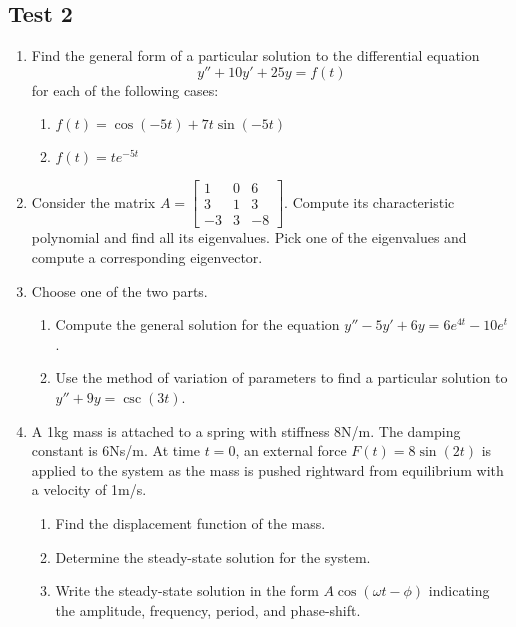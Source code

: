\subsection{Test 2}

\begin{enumerate}[label=\arabic*.]
	\item 
		Find the general form of a particular solution to the differential equation
		\begin{equation*}
			y'' + 10y' + 25y = f(t)
		\end{equation*}
		for each of the following cases:
		\begin{enumerate}[label=(\alph*)]
			\item 
				$f(t) = \cos{(-5t)} + 7t\sin{(-5t)}$
			\item
				$f(t) = te^{-5t}$
		\end{enumerate}
	\item
		Consider the matrix $A = \begin{bmatrix}
			1  & 0 & 6 \\
			3  & 1 & 3 \\
			-3 & 3 & -8
		\end{bmatrix}$. Compute its characteristic polynomial and find all its eigenvalues. Pick one of the eigenvalues and compute a corresponding eigenvector.
	\item
		Choose one of the two parts.
		\begin{enumerate}[label=(\alph*)]
			\item 
				Compute the general solution for the equation $y'' - 5y' + 6y = 6e^{4t} - 10e^{t}$.
			\item Use the method of variation of parameters to find a particular solution to $y'' + 9y = \csc{(3t)}$.
		\end{enumerate}
	\item
		A 1kg mass is attached to a spring with stiffness 8N/m. The damping constant is 6Ns/m. At time $t=0$, an external force $F(t) = 8\sin{(2t)}$ is applied to the system as the mass is pushed rightward from equilibrium with a velocity of 1m/s.
		\begin{enumerate}[label=(\alph*)]
			\item
				Find the displacement function of the mass.
			\item
				Determine the steady-state solution for the system.
			\item
				Write the steady-state solution in the form $A\cos{(\omega t - \phi)}$ indicating the amplitude, frequency, period, and phase-shift.

\end{enumerate}
\end{enumerate}
